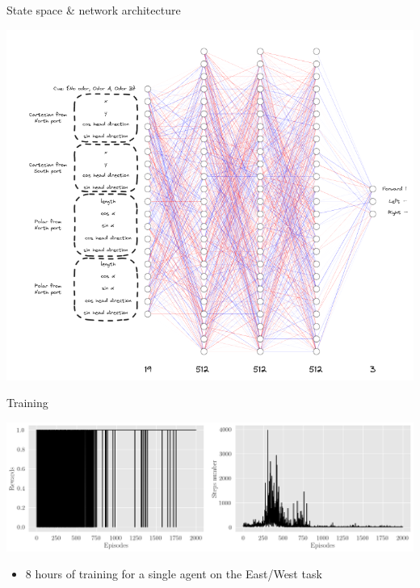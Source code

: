 \documentclass[bigger]{beamer}
\begin{document}
\begin{frame}[label={sec:orgb0b4077}]{State space \& network architecture}
\begin{center}
\includegraphics[height=0.95\textheight]{img/state-space-nn.png}
\end{center}
\end{frame}
\begin{frame}[label={sec:orgbe74e7f}]{Training}
\begin{center}
\includegraphics[width=\textwidth]{img/steps-and-rewards.png}
\end{center}
\begin{itemize}
\item 8 hours of training for a single agent on the East/West task
\end{itemize}
\end{frame}
\end{document}
